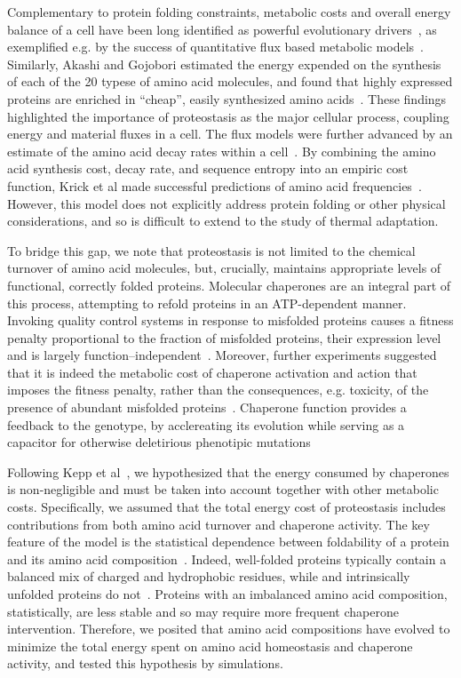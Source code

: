 \documentclass[10pt,letterpaper]{article}
\begin{document}
Complementary to protein folding constraints, metabolic costs and overall energy balance of a cell have been long identified as powerful evolutionary drivers~\cite{Pal2006An}, as exemplified e.g. by the success of quantitative flux based metabolic models~\cite{Varma1994Metabolic,Price2004Genome}. Similarly, Akashi and Gojobori estimated the energy expended on the synthesis of each of the 20 typese of amino acid molecules, and found that highly expressed proteins are enriched in ``cheap'', easily synthesized amino acids~\cite{Akashi2002Metabolic}. These findings highlighted the importance of proteostasis as the major cellular process, coupling energy and material fluxes in a cell. The flux models were further advanced by an estimate of the amino acid decay rates within a cell~\cite{Krick2014Amino}. By combining the amino acid synthesis cost, decay rate, and sequence entropy into an empiric cost function, Krick et al made successful predictions of amino acid frequencies~\cite{Krick2014Amino}. However, this model does not explicitly address protein folding or other physical considerations, and so is difficult to extend to the study of thermal adaptation.

To bridge this gap, we note that proteostasis is not limited to the chemical turnover of amino acid molecules, but, crucially, maintains appropriate levels of functional, correctly folded proteins. Molecular chaperones are an integral part of this process, attempting to refold proteins in an ATP-dependent manner. Invoking quality control systems in response to misfolded proteins causes a fitness penalty proportional to the fraction of misfolded proteins, their expression level and is largely function--independent~\cite{Samerotte2011Misfolded}. Moreover, further experiments suggested that it is indeed the metabolic cost of chaperone activation and action that imposes the fitness penalty, rather than the consequences, e.g. toxicity, of the presence of abundant misfolded proteins~\cite{Tomala2014Fitness}. Chaperone function provides a feedback to the genotype, by acclereating its evolution while serving as a capacitor for otherwise deletirious phenotipic mutations~\cite{Bogumil2012Cumulative,Cetinbas2013Catalysis}

Following Kepp et al~\cite{Kepp2014Model}, we hypothesized that the energy consumed by chaperones is non-negligible and must be taken into account together with other metabolic costs. Specifically, we assumed that the total energy cost of proteostasis includes contributions from both amino acid turnover and chaperone activity. The key feature of the model is the statistical dependence between foldability of a protein and its amino acid composition~\cite{Dill1985Theory,Berezovsky2007Positive,Venev2015Massively}. Indeed, well-folded proteins typically  contain a balanced mix of charged and hydrophobic residues, while and intrinsically unfolded proteins do not~\cite{Uversky2000Why}. Proteins with an imbalanced amino acid composition, statistically, are less stable and so may require more frequent chaperone intervention. Therefore, we posited that amino acid compositions have evolved to minimize the total energy spent on amino acid homeostasis and chaperone activity, and tested this hypothesis by simulations.
\end{document}
